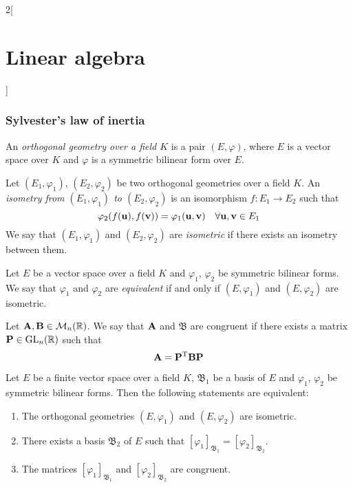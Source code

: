 \documentclass[../../../main.tex]{subfiles}
\begin{document}
\begin{multicols}{2}[\section{Linear algebra}]
\subsubsection*{Sylvester's law of inertia}
\begin{definition}
    An \textit{orthogonal geometry over a field $K$} is a pair $(E,\varphi)$, where $E$ is a vector space over $K$ and $\varphi$ is a symmetric bilinear form over $E$.
\end{definition}
\begin{definition}\label{isometry}
    Let $(E_1,\varphi_1)$, $(E_2,\varphi_2)$ be two orthogonal geometries over a field $K$. An \textit{isometry from $(E_1,\varphi_1)$ to $(E_2,\varphi_2)$} is an isomorphism $f:E_1\rightarrow E_2$ such that $$\varphi_2(f(\vb{u}),f(\vb{v}))=\varphi_1(\vb{u},\vb{v})\quad\forall\vb{u},\vb{v}\in E_1$$ We say that $(E_1,\varphi_1)$ and $(E_2,\varphi_2)$ are \textit{isometric} if there exists an isometry between them.
\end{definition}
\begin{definition}
    Let $E$ be a vector space over a field $K$ and $\varphi_1$, $\varphi_2$ be symmetric bilinear forms. We say that $\varphi_1$ and $\varphi_2$ are \textit{equivalent} if and only if $(E,\varphi_1)$ and $(E,\varphi_2)$ are isometric.
\end{definition}
\begin{definition}
    Let $\vb{A},\vb{B}\in\mathcal{M}_n(\mathbb{R})$. We say that $\vb{A}$ and $\mathfrak{B}$ are congruent if there exists a matrix $\vb{P}\in\mathrm{GL}_n(\mathbb{R})$ such that $$\vb{A}=\vb{P}^{\mathrm{T}}\vb{B}\vb{P}$$
\end{definition}
\begin{prop}
    Let $E$ be a finite vector space over a field $K$, $\mathfrak{B}_1$ be a basis of $E$ and $\varphi_1$, $\varphi_2$ be symmetric bilinear forms. Then the following statements are equivalent:
    \begin{enumerate}
        \item The orthogonal geometries $(E,\varphi_1)$ and $(E,\varphi_2)$ are isometric.
        \item There exists a basis $\mathfrak{B}_2$ of $E$ such that $[\varphi_1]_{\mathfrak{B}_1}=[\varphi_2]_{\mathfrak{B}_2}$.
        \item The matrices $[\varphi_1]_{\mathfrak{B}_1}$ and $[\varphi_2]_{\mathfrak{B}_2}$ are congruent.
    \end{enumerate}

\end{prop}
\end{multicols}
\end{document}
